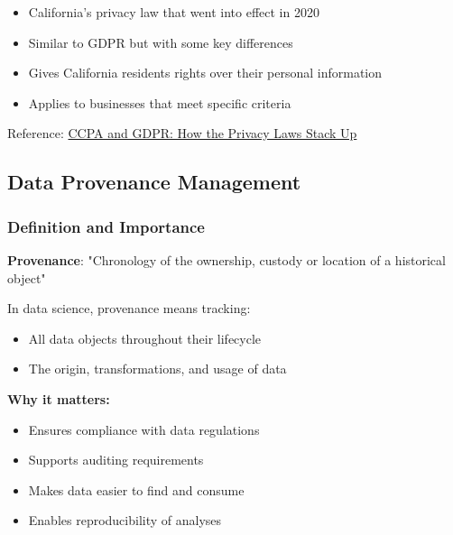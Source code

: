 \documentclass[12pt]{article}
\begin{document}
\begin{tcolorbox}[colback=blue!5!white,colframe=blue!75!black,title={CCPA (California Consumer Privacy Act)}]
\begin{itemize}
    \item California's privacy law that went into effect in 2020
    \item Similar to GDPR but with some key differences
    \item Gives California residents rights over their personal information
    \item Applies to businesses that meet specific criteria
\end{itemize}
Reference: \href{https://riskonnect.com/uk/regulatory-compliance/ccpa-and-gdpr-how-the-privacy-laws-stack-up/}{CCPA and GDPR: How the Privacy Laws Stack Up}
\end{tcolorbox}

\subsection{Data Provenance Management}

\subsubsection{Definition and Importance}
\begin{tcolorbox}[colback=yellow!5!white,colframe=yellow!75!black,title={What is Provenance?}]
\textbf{Provenance}: "Chronology of the ownership, custody or location of a historical object"

In data science, provenance means tracking:
\begin{itemize}
    \item All data objects throughout their lifecycle
    \item The origin, transformations, and usage of data
\end{itemize}

\textbf{Why it matters:}
\begin{itemize}
    \item Ensures compliance with data regulations
    \item Supports auditing requirements
    \item Makes data easier to find and consume
    \item Enables reproducibility of analyses
\end{itemize}
\end{tcolorbox}
\end{document}
